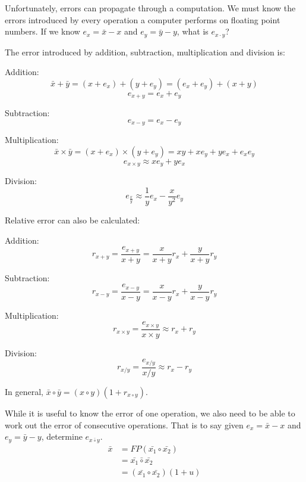 Unfortunately, errors can propagate through a computation. We must know the
errors introduced by every operation a computer performs on floating point
numbers. If we know $e_x = \bar{x} - x$ and $e_y = \bar{y} - y$, what is $e_{x
\cdot y}$?

The error introduced by addition, subtraction, multiplication and division is:

\begin{description}
  \item Addition:
  \[
    \bar{x} + \bar{y} = (x + e_x) + (y + e_y) = (e_x + e_y) + (x + y)
  \]
  \[
    e_{x+y} = e_x + e_y
  \]
  \item Subtraction:
  \[
    e_{x-y} = e_x - e_y
  \]
  \item Multiplication:
  \[
    \bar{x} \times \bar{y} = (x + e_x) \times (y + e_y) =
      xy + xe_y + ye_x + e_xe_y
  \]
  \[
    e_{x \times y} \approx xe_y + ye_x
  \]
  \item Division:
  \[
    e_\frac{x}{y} \approx \frac{1}{y}e_x - \frac{x}{y^2}e_y
  \]
\end{description}

Relative error can also be calculated:

\begin{description}
  \item Addition:
    \[
      r_{x+y} = \frac{e_{x+y}}{x + y} = \frac{x}{x + y}r_x + \frac{y}{x + y}r_y
    \]
  \item Subtraction:
    \[
      r_{x-y} = \frac{e_{x-y}}{x - y} = \frac{x}{x - y}r_x + \frac{y}{x - y}r_y
    \]
  \item Multiplication:
    \[
      r_{x \times y} = \frac{e_{x \times y}}{x \times y} \approx r_x + r_y
    \]
  \item Division:
    \[
      r_{x / y} = \frac{e_{x / y}}{x / y} \approx r_x - r_y
    \]
\end{description}

In general, $\bar{x} \circ \bar{y} = (x \circ y)(1 + r_{x \circ y})$.


While it is useful to know the error of one operation, we also need to be able
to work out the error of consecutive operations. That is to say given $e_x =
\bar{x} - x$ and  $e_y = \bar{y} - y$, determine $e_{x \bar{\circ} y}$.
\[
  \begin{split}
  \bar{x} &= FP(\bar{x_1} \circ \bar{x_2})\\
          &= \bar{x_1} \bar{\circ} \bar{x_2}\\
          &= (\bar{x_1} \circ \bar{x_2})(1 + u)\\
  \end{split}
\]

